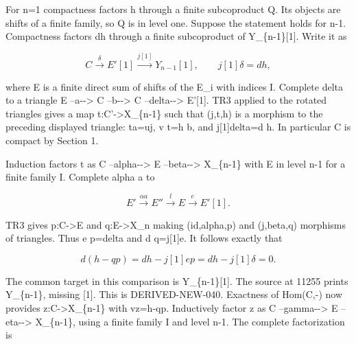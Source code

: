 For n\allowbreak{}=1 compactness factors h through a finite subcoproduct Q. Its objects are shifts of a finite family,\allowbreak{} so Q is in level one. Suppose the statement holds for n-1. Compactness factors dh through a finite subcoproduct of Y\_\allowbreak{}\{n-1\}[1]\allowbreak{}. Write it as

\[
 C\xrightarrow\delta E'[1]\xrightarrow{j[1]}Y_{n-1}[1],
 \qquad j[1]\delta=dh,
\]

where E\textquotesingle{} is a finite direct sum of shifts of the E\_\allowbreak{}i with indices I\textquotesingle. Complete delta to a triangle E\textquotesingle{} --a-\allowbreak{}-> C\textquotesingle{} --b-\allowbreak{}-> C --delta-\allowbreak{}-> E'[1]\allowbreak{}. TR3 applied to the rotated triangles gives a map t:\allowbreak{}C'\allowbreak{}->X\_\allowbreak{}\{n-1\} such that (j,\allowbreak{}t,\allowbreak{}h)\allowbreak{} is a morphism to the preceding displayed triangle:\allowbreak{} ta\allowbreak{}=uj,\allowbreak{} v t\allowbreak{}=h b,\allowbreak{} and j[1]\allowbreak{}delta\allowbreak{}=d h. In particular C\textquotesingle{} is compact by Section 1.

Induction factors t as C\textquotesingle{} --alpha-\allowbreak{}-> E\textquotesingle\textquotesingle{} --beta-\allowbreak{}-> X\_\allowbreak{}\{n-1\} with E\textquotesingle\textquotesingle{} in level n-1 for a finite family I\textquotesingle\textquotesingle. Complete alpha a to

\[
 E'\xrightarrow{\alpha a}E''\xrightarrow l E
                     \xrightarrow e E'[1].
\]

TR3 gives p:\allowbreak{}C\allowbreak{}->E and q:\allowbreak{}E\allowbreak{}->X\_\allowbreak{}n making (id,\allowbreak{}alpha,\allowbreak{}p)\allowbreak{} and (j,\allowbreak{}beta,\allowbreak{}q)\allowbreak{} morphisms of triangles. Thus e p\allowbreak{}=delta and d q\allowbreak{}=j[1]\allowbreak{}e. It follows exactly that

\[
 d(h-qp)=dh-j[1]ep=dh-j[1]\delta=0.
\]

The common target in this comparison is Y\_\allowbreak{}\{n-1\}[1]\allowbreak{}. The source at 11255 prints Y\_\allowbreak{}\{n-1\},\allowbreak{} missing [1]\allowbreak{}. This is DERIVED-NEW-040. Exactness of Hom(C,\allowbreak{}-)\allowbreak{} now provides z:\allowbreak{}C\allowbreak{}->X\_\allowbreak{}\{n-1\} with vz\allowbreak{}=h-qp. Inductively factor z as C --gamma-\allowbreak{}-> E\textquotesingle\textquotesingle\textquotesingle{} --eta-\allowbreak{}-> X\_\allowbreak{}\{n-1\},\allowbreak{} using a finite family I\textquotesingle\textquotesingle\textquotesingle{} and level n-1. The complete factorization is

